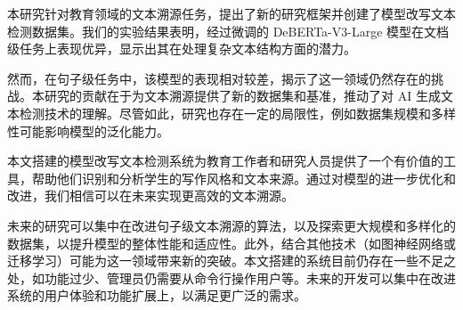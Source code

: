 %
%
%
%

\begin{conclusion}

本研究针对教育领域的文本溯源任务，提出了新的研究框架并创建了模型改写文本检测数据集。我们的实验结果表明，经过微调的 DeBERTa-V3-Large 模型在文档级任务上表现优异，显示出其在处理复杂文本结构方面的潜力。

然而，在句子级任务中，该模型的表现相对较差，揭示了这一领域仍然存在的挑战。本研究的贡献在于为文本溯源提供了新的数据集和基准，推动了对 AI 生成文本检测技术的理解。尽管如此，研究也存在一定的局限性，例如数据集规模和多样性可能影响模型的泛化能力。

本文搭建的模型改写文本检测系统为教育工作者和研究人员提供了一个有价值的工具，帮助他们识别和分析学生的写作风格和文本来源。通过对模型的进一步优化和改进，我们相信可以在未来实现更高效的文本溯源。

未来的研究可以集中在改进句子级文本溯源的算法，以及探索更大规模和多样化的数据集，以提升模型的整体性能和适应性。此外，结合其他技术（如图神经网络或迁移学习）可能为这一领域带来新的突破。本文搭建的系统目前仍存在一些不足之处，如功能过少、管理员仍需要从命令行操作用户等。未来的开发可以集中在改进系统的用户体验和功能扩展上，以满足更广泛的需求。

\end{conclusion}
